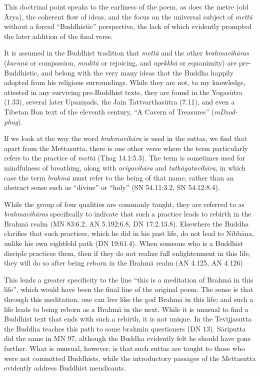 \documentclass[12pt,openany]{book}%
\begin{document}
This doctrinal point speaks to the earliness of the poem, as does the metre (old Ārya), the coherent flow of ideas, and the focus on the universal subject of \textit{\textsanskrit{mettā}} without a forced “Buddhistic” perspective, the lack of which evidently prompted the later addition of the final verse.

It is assumed in the Buddhist tradition that \textit{\textsanskrit{mettā}} and the other \textit{\textsanskrit{brahmavihāras}} (\textit{\textsanskrit{karuṇā}} or compassion, \textit{\textsanskrit{muditā}} or rejoicing, and \textit{\textsanskrit{upekkhā}} or equanimity) are pre-Buddhistic, and belong with the very many ideas that the Buddha happily adopted from his religious surroundings. While they are not, to my knowledge, attested in any surviving pre-Buddhist texts, they are found in the \textsanskrit{Yogasūtra} (1.33), several later \textsanskrit{Upaniṣads}, the Jain \textsanskrit{Tattvarthasūtra} (7.11), and even a Tibetan Bon text of the eleventh century, “A Cavern of Treasures” (\textit{mDzod-phug}).

If we look at the way the word \textit{\textsanskrit{brahmavihāra}} is used in the suttas, we find that apart from the Mettasutta, there is one other verse where the term particularly refers to the practice of \textit{\textsanskrit{mettā}} (Thag 14.1:5.3). The term is sometimes used for mindfulness of breathing, along with \textit{\textsanskrit{ariyavihāra}} and \textit{\textsanskrit{tathāgatavihāra}}, in which case the term \textit{\textsanskrit{brahmā}} must refer to the being of that name, rather than an abstract sense such as “divine” or “holy” (SN 54.11:3.2, SN 54.12:8.4).

While the group of four qualities are commonly taught, they are referred to as \textit{\textsanskrit{brahmavihāras}} specifically to indicate that such a practice leads to rebirth in the \textsanskrit{Brahmā} realm (MN 83:6.2, AN 5.192:6.8, DN 17:2.13.8). Elsewhere the Buddha clarifies that such practices, which he did in his past life, do not lead to \textsanskrit{Nibbāna}, unlike his own eightfold path (DN 19:61.4). When someone who is a Buddhist disciple practices them, then if they do not realize full enlightenment in this life, they will do so after being reborn in the \textsanskrit{Brahmā} realm (AN 4.125, AN 4.126)

This lends a greater specificity to the line “this is a meditation of \textsanskrit{Brahmā} in this life”, which would have been the final line of the original poem. The sense is that through this meditation, one can live like the god \textsanskrit{Brahmā} in this life; and such a life leads to being reborn as a \textsanskrit{Brahmā} in the next. While it is unusual to find a Buddhist text that ends with such a rebirth, it is not unique. In the Tevijjasutta the Buddha teaches this path to some brahmin questioners (DN 13). \textsanskrit{Sāriputta} did the same in MN 97, although the Buddha evidently felt he should have gone further. What is unusual, however, is that such suttas are taught to those who were not committed Buddhists, while the introductory passages of the Mettasutta evidently address Buddhist mendicants.
\end{document}
